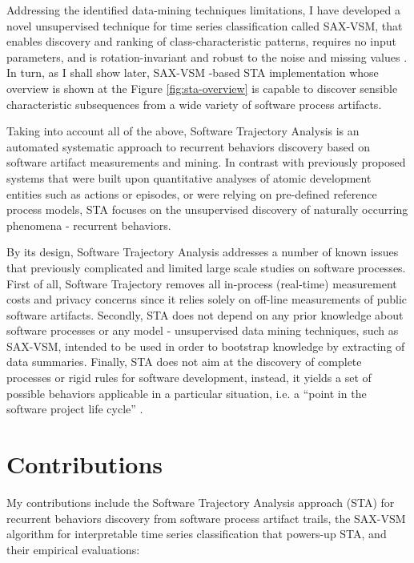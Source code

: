 Addressing the identified data-mining techniques limitations, 
I have developed a novel unsupervised technique for time series classification called SAX-VSM, that enables 
discovery and ranking of class-characteristic patterns, requires no input parameters, and is rotation-invariant 
and robust to the noise and missing values \cite{sax-vsm}. 
In turn, as I shall show later, SAX-VSM -based STA implementation whose overview is shown at the Figure \ref{fig:sta-overview} 
is capable to discover sensible characteristic subsequences from a wide variety of software process artifacts.

Taking into account all of the above, Software Trajectory Analysis is an automated systematic approach to 
recurrent behaviors discovery based on software artifact measurements and mining. 
In contrast with previously proposed systems that were built upon quantitative analyses of atomic development 
entities such as actions or episodes, or were relying on pre-defined reference process models, 
STA focuses on the unsupervised discovery of naturally occurring phenomena - recurrent behaviors. 

By its design, Software Trajectory Analysis addresses a number of known issues that previously complicated and 
limited large scale studies on software processes.
First of all, Software Trajectory removes all in-process (real-time) measurement costs and privacy concerns since 
it relies solely on off-line measurements of public software artifacts. 
Secondly, STA does not depend on any prior knowledge about software processes or any model - unsupervised 
data mining techniques, such as SAX-VSM, intended to be used in order to bootstrap knowledge by extracting of 
data summaries. 
Finally, STA does not aim at the discovery of complete processes or rigid rules for software development, instead,
it yields a set of possible behaviors applicable in a particular situation, 
i.e. a ``point in the software project life cycle'' \cite{demillo1980software}.


\section{Contributions}\label{section_contributions}
My contributions include the Software Trajectory Analysis approach (STA) for recurrent behaviors discovery
from software process artifact trails, the SAX-VSM algorithm for interpretable time series classification 
that powers-up STA, and their empirical evaluations: 

